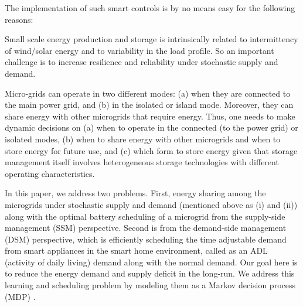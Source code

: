 The implementation of such smart controls is by no means easy for the following reasons:
\begin{inparaenum}[\bfseries (i)]
\item Small scale energy production and storage is intrinsically
         related to intermittency of wind/solar energy and to variability in the load profile.
          So an important challenge is to increase resilience and reliability under stochastic supply and
                 demand.
\item Micro-grids can operate in two different modes: (a) when they are connected to the
main power grid, and (b) in the isolated or island mode. Moreover, they can share energy with
other microgrids that require energy. Thus, one needs to make
dynamic decisions on (a) when to operate in the connected (to the power grid) or isolated modes, 
(b) when to share energy with other microgrids and when to store energy for future use, and (c) 
which form to store energy given that storage management itself
involves heterogeneous storage technologies with different
operating characteristics.
\end{inparaenum}


In this paper, we address two  problems. First,  energy sharing among the microgrids under stochastic supply and demand (mentioned above as (i) and (ii)) along with the optimal battery scheduling of a microgrid from the supply-side management (SSM) perspective. Second is from the demand-side management (DSM) perspective, which is efficiently scheduling the time adjustable demand from smart appliances in the smart home environment, called as an ADL (activity of daily living) demand along with the normal demand.  Our goal here is to reduce the energy demand and supply deficit in the long-run. We address this learning and scheduling problem by modeling them as a Markov decision process (MDP) \cite{puterman2014markov, vol2}. 

